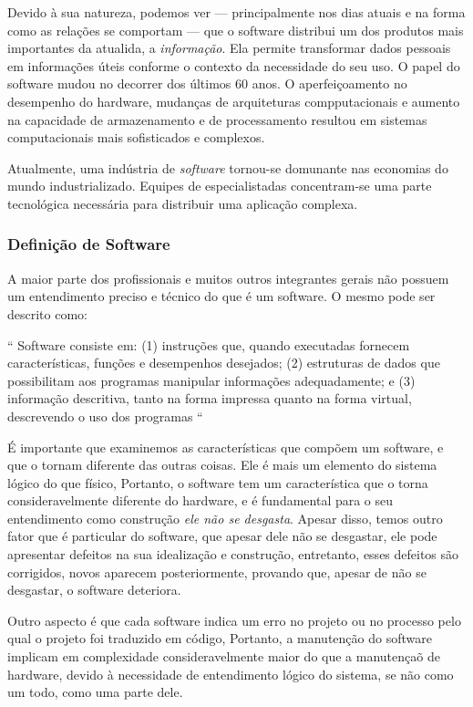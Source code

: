 \documentclass[12pt, a4paper]{paper}
\begin{document}
Devido à sua natureza, podemos ver --- principalmente nos dias atuais e na forma como as relações se comportam --- que o software distribui um dos produtos mais importantes da atualida, a \textit{informação}. Ela permite transformar dados pessoais em informações úteis conforme o contexto da necessidade do seu uso. O papel do software mudou no decorrer dos últimos 60 anos. O aperfeiçoamento no desempenho do hardware, mudanças de arquiteturas compputacionais e aumento na capacidade de armazenamento e de processamento resultou em sistemas computacionais mais sofisticados e complexos.\par 
Atualmente, uma indústria de \textit{software} tornou-se domunante nas economias do mundo industrializado. Equipes de especialistadas concentram-se uma parte tecnológica necessária para distribuir uma aplicação complexa.

\subsubsection{Definição de Software}
A maior parte dos profissionais e muitos outros integrantes gerais não possuem um entendimento preciso e técnico do que é um software. O mesmo pode ser descrito como:

\vspace{0.5cm}

``
 Software consiste em: (1) instruções que, quando executadas fornecem características, funções e desempenhos desejados; (2) estruturas de dados que possibilitam aos programas manipular informações adequadamente; e (3) informação descritiva, tanto na forma impressa quanto na forma virtual, descrevendo o uso dos programas
``

\vspace{0.5cm}

É importante que examinemos as características que compõem um software, e que o tornam diferente das outras coisas. Ele é mais um elemento do sistema lógico do que físico, Portanto, o software tem um característica que o torna consideravelmente diferente do hardware, e é fundamental para o seu entendimento como construção \textit{ele não se desgasta}. Apesar disso, temos outro fator que é particular do software, que apesar dele não se desgastar, ele pode apresentar defeitos na sua idealização e construção, entretanto, esses defeitos são corrigidos, novos aparecem posteriormente, provando que, apesar de não se desgastar, o software deteriora.
\par 
Outro aspecto é que cada software indica um erro no projeto ou no processo pelo qual o projeto foi traduzido em código, Portanto, a manutenção do software implicam em complexidade consideravelmente maior do que a manutençaõ de hardware, devido à necessidade de entendimento lógico do sistema, se não como um todo, como uma parte dele.
\end{document}
